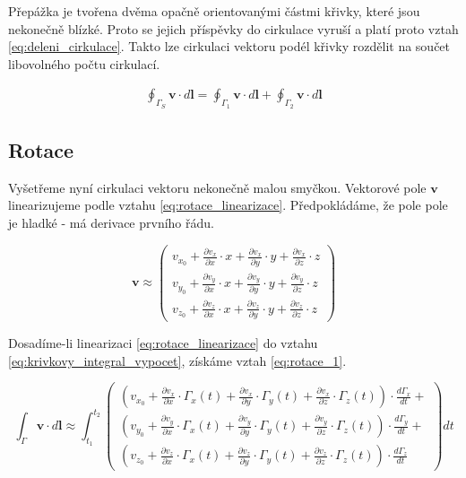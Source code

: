 \documentclass{book}
\newcommand{\vect}[1]{\boldsymbol{#1}}
\begin{document}
Přepážka je tvořena dvěma opačně orientovanými částmi křivky, které jsou nekonečně blízké. Proto se jejich příspěvky do cirkulace vyruší a platí proto vztah \eqref{eq:deleni_cirkulace}. Takto lze cirkulaci vektoru podél křivky rozdělit na součet libovolného počtu cirkulací.

\begin{equation}
\label{eq:deleni_cirkulace}
\begin{split}
\oint_{\Gamma_S} \vect{v} \cdot d\vect{l} = \oint_{\Gamma_1} \vect{v} \cdot d\vect{l} + \oint_{\Gamma_2} \vect{v} \cdot d\vect{l}
\end{split}
\end{equation}

\subsection{Rotace}
\label{sec:rotace}

Vyšetřeme nyní cirkulaci vektoru nekonečně malou smyčkou. Vektorové pole \(\vect{v}\) linearizujeme podle vztahu \eqref{eq:rotace_linearizace}.
Předpokládáme, že pole pole je hladké - má derivace prvního řádu.

\begin{equation}
\label{eq:rotace_linearizace}
\vect{v} \approx \begin{pmatrix}
v_{x_0} + \frac{\partial v_x}{\partial x} \cdot x + \frac{\partial v_x}{\partial y} \cdot y + \frac{\partial v_x}{\partial z} \cdot z \\
v_{y_0} + \frac{\partial v_y}{\partial x} \cdot x + \frac{\partial v_y}{\partial y} \cdot y + \frac{\partial v_y}{\partial z} \cdot z \\
v_{z_0} + \frac{\partial v_z}{\partial x} \cdot x + \frac{\partial v_z}{\partial y} \cdot y + \frac{\partial v_z}{\partial z} \cdot z
\end{pmatrix}
\end{equation}

Dosadíme-li linearizaci \eqref{eq:rotace_linearizace} do vztahu \eqref{eq:krivkovy_integral_vypocet}, získáme vztah \eqref{eq:rotace_1}.

\begin{equation}
\label{eq:rotace_1}
\int_\Gamma \vect{v} \cdot d\vect{l} \approx
\int_{t_1}^{t_2} \begin{pmatrix}
\left(v_{x_0} + \frac{\partial v_x}{\partial x} \cdot \Gamma_x(t) + \frac{\partial v_x}{\partial y} \cdot \Gamma_y(t) + \frac{\partial v_x}{\partial z} \cdot \Gamma_z(t)\right) \cdot \frac{d \Gamma_x}{dt} + \\
\left(v_{y_0} + \frac{\partial v_y}{\partial x} \cdot \Gamma_x(t) + \frac{\partial v_y}{\partial y} \cdot \Gamma_y(t) + \frac{\partial v_y}{\partial z} \cdot \Gamma_z(t)\right) \cdot \frac{d \Gamma_y}{dt} + \\
\left(v_{z_0} + \frac{\partial v_z}{\partial x} \cdot \Gamma_x(t) + \frac{\partial v_z}{\partial y} \cdot \Gamma_y(t) + \frac{\partial v_z}{\partial z} \cdot \Gamma_z(t)\right) \cdot \frac{d \Gamma_z}{dt}
\end{pmatrix} dt
\end{equation}
\end{document}
